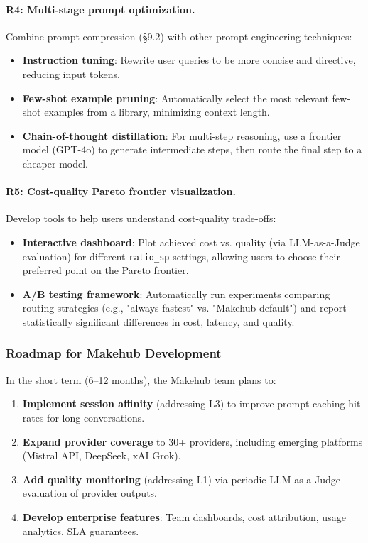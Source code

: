 \documentclass[english]{article}
\begin{document}
\paragraph{R4: Multi-stage prompt optimization.}

Combine prompt compression (§9.2) with other prompt engineering techniques:
\begin{itemize}
    \item \textbf{Instruction tuning}: Rewrite user queries to be more concise and directive, reducing input tokens.
    \item \textbf{Few-shot example pruning}: Automatically select the most relevant few-shot examples from a library, minimizing context length.
    \item \textbf{Chain-of-thought distillation}: For multi-step reasoning, use a frontier model (GPT-4o) to generate intermediate steps, then route the final step to a cheaper model.
\end{itemize}

\paragraph{R5: Cost-quality Pareto frontier visualization.}

Develop tools to help users understand cost-quality trade-offs:
\begin{itemize}
    \item \textbf{Interactive dashboard}: Plot achieved cost vs. quality (via LLM-as-a-Judge evaluation) for different \texttt{ratio\_sp} settings, allowing users to choose their preferred point on the Pareto frontier.
    \item \textbf{A/B testing framework}: Automatically run experiments comparing routing strategies (e.g., "always fastest" vs. "Makehub default") and report statistically significant differences in cost, latency, and quality.
\end{itemize}

\subsubsection{Roadmap for Makehub Development}

In the short term (6--12 months), the Makehub team plans to:
\begin{enumerate}
    \item \textbf{Implement session affinity} (addressing L3) to improve prompt caching hit rates for long conversations.
    \item \textbf{Expand provider coverage} to 30+ providers, including emerging platforms (Mistral API, DeepSeek, xAI Grok).
    \item \textbf{Add quality monitoring} (addressing L1) via periodic LLM-as-a-Judge evaluation of provider outputs.
    \item \textbf{Develop enterprise features}: Team dashboards, cost attribution, usage analytics, SLA guarantees.
\end{enumerate}
\end{document}
